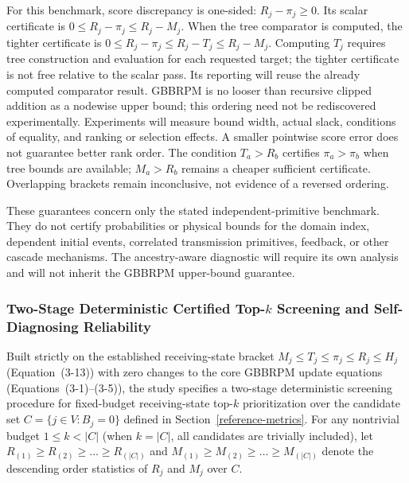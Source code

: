 For this benchmark, score discrepancy is one-sided: $R_j-\pi_j\ge0$.
Its scalar certificate is $0\le R_j-\pi_j\le R_j-M_j$.
When the tree comparator is computed, the tighter certificate is
$0\le R_j-\pi_j\le R_j-T_j\le R_j-M_j$.
Computing $T_j$ requires tree construction and evaluation for each requested
target; the tighter certificate is not free relative to the scalar pass.
Its reporting will reuse the already computed comparator result.
GBBRPM is no looser than recursive clipped addition as a nodewise upper
bound; this ordering need not be rediscovered experimentally. Experiments
will measure bound width, actual slack, conditions of equality, and
ranking or selection effects. A smaller pointwise score error does not
guarantee better rank order. The condition $T_a>R_b$ certifies
$\pi_a>\pi_b$ when tree bounds are available; $M_a>R_b$ remains a cheaper
sufficient certificate. Overlapping brackets remain inconclusive,
not evidence of a reversed ordering.

These guarantees concern only the stated independent-primitive benchmark.
They do not certify probabilities or physical bounds for the domain index,
dependent initial events, correlated transmission primitives, feedback, or
other cascade mechanisms. The ancestry-aware diagnostic will require its
own analysis and will not inherit the GBBRPM upper-bound guarantee.

\subsubsection{Two-Stage Deterministic Certified Top-\texorpdfstring{$k$}{k} Screening and Self-Diagnosing Reliability}
\label{certified-screening}

Built strictly on the established receiving-state bracket
$M_j\le T_j\le\pi_j\le R_j\le H_j$ (Equation~(3-13)) with zero changes to
the core GBBRPM update equations (Equations~(3-1)--(3-5)), the study
specifies a two-stage deterministic screening procedure for fixed-budget
receiving-state top-$k$ prioritization over the candidate set
$C=\{j\in V:B_j=0\}$ defined in Section~\ref{reference-metrics}. For any
nontrivial budget $1\le k<|C|$ (when $k=|C|$, all candidates are trivially
included), let $R_{(1)}\ge R_{(2)}\ge\dots\ge R_{(|C|)}$ and
$M_{(1)}\ge M_{(2)}\ge\dots\ge M_{(|C|)}$ denote the descending order
statistics of $R_j$ and $M_j$ over $C$.

